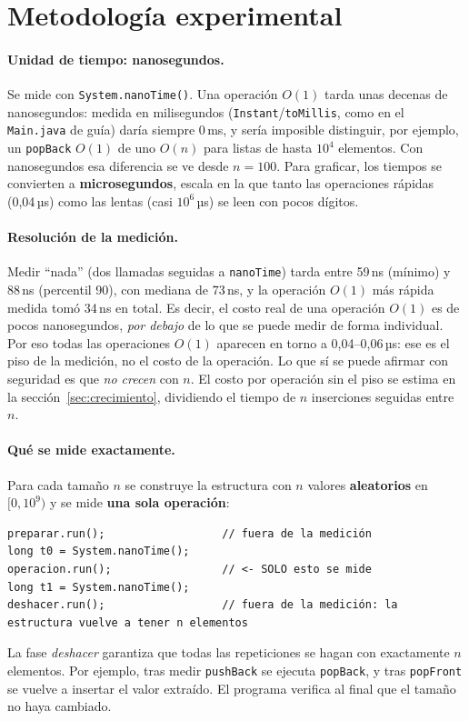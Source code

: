 \documentclass[11pt,a4paper]{article}
\newcommand{\us}{\,µs}
\newcommand{\Oone}{$O(1)$}
\newcommand{\On}{$O(n)$}
\begin{document}
\section{Metodología experimental}\label{sec:metodologia}

\paragraph{Unidad de tiempo: nanosegundos.} Se mide con \texttt{System.nanoTime()}. Una operación
\Oone{} tarda unas decenas de nanosegundos: medida en milisegundos (\texttt{Instant}/\texttt{toMillis},
como en el \texttt{Main.java} de guía) daría siempre 0\,ms, y sería imposible distinguir, por ejemplo,
un \texttt{popBack} \Oone{} de uno \On{} para listas de hasta $10^4$ elementos. Con nanosegundos esa
diferencia se ve desde $n = 100$. Para graficar, los tiempos se convierten a \textbf{microsegundos},
escala en la que tanto las operaciones rápidas (0,04\us) como las lentas (casi $10^6$\us) se leen con
pocos dígitos.

\paragraph{Resolución de la medición.} Medir ``nada'' (dos llamadas seguidas a \texttt{nanoTime}) tarda
entre 59\,ns (mínimo) y 88\,ns (percentil 90), con mediana de 73\,ns, y la operación \Oone{} más rápida medida tomó 34\,ns en total. Es
decir, el costo real de una operación \Oone{} es de pocos nanosegundos, \emph{por debajo} de lo que se
puede medir de forma individual. Por eso todas las operaciones \Oone{} aparecen en torno a 0,04--0,06\us:
ese es el piso de la medición, no el costo de la operación. Lo que sí se puede afirmar con
seguridad es que \emph{no crecen} con $n$. El costo por operación sin el piso se estima en la
sección~\ref{sec:crecimiento}, dividiendo el tiempo de $n$ inserciones seguidas entre $n$.

\paragraph{Qué se mide exactamente.} Para cada tamaño $n$ se construye la estructura con $n$ valores
\textbf{aleatorios} en $[0, 10^9)$ y se mide \textbf{una sola operación}:
\begin{lstlisting}
preparar.run();                  // fuera de la medición
long t0 = System.nanoTime();
operacion.run();                 // <- SOLO esto se mide
long t1 = System.nanoTime();
deshacer.run();                  // fuera de la medición: la estructura vuelve a tener n elementos
\end{lstlisting}
La fase \emph{deshacer} garantiza que todas las repeticiones se hagan con exactamente $n$ elementos.
Por ejemplo, tras medir \texttt{pushBack} se ejecuta \texttt{popBack}, y tras \texttt{popFront} se
vuelve a insertar el valor extraído. El programa verifica al final que el tamaño no haya cambiado.
\end{document}
